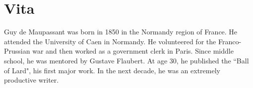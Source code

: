 \chapter*{Vita}
Guy de Maupassant was born in 1850 in the Normandy region of France. He attended the University of Caen in Normandy. He volunteered for the Franco-Prussian war and then worked as a government clerk in Paris. Since middle school, he was mentored by Gustave Flaubert. At age 30, he published the ``Ball of Lard", his first major work. In the next decade, he was an extremely productive writer. 